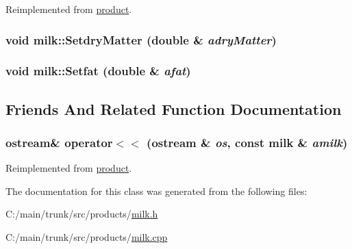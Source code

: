 Reimplemented from \hyperlink{classproduct_a1edb3e3d0619a2db8b8f1c95fed582ce}{product}.\hypertarget{classmilk_a69060a252027a2f9f08e42ed6e2a7db3}{
\subsubsection[{SetdryMatter}]{\setlength{\rightskip}{0pt plus 5cm}void milk::SetdryMatter (double \& {\em adryMatter})}}
\label{classmilk_a69060a252027a2f9f08e42ed6e2a7db3}
\hypertarget{classmilk_a23ab5951cc404f938184aa3b44080719}{
\subsubsection[{Setfat}]{\setlength{\rightskip}{0pt plus 5cm}void milk::Setfat (double \& {\em afat})}}
\label{classmilk_a23ab5951cc404f938184aa3b44080719}


\subsection{Friends And Related Function Documentation}
\hypertarget{classmilk_adc53dfc2bbc4f8463e61ccb3c45f5ee0}{
\subsubsection[{operator$<$$<$}]{\setlength{\rightskip}{0pt plus 5cm}ostream\& operator$<$$<$ (ostream \& {\em os}, \/  const {\bf milk} \& {\em amilk})}}
\label{classmilk_adc53dfc2bbc4f8463e61ccb3c45f5ee0}


Reimplemented from \hyperlink{classproduct_a1b6bf2f2c82a18a17907ee1192fd94bb}{product}.

The documentation for this class was generated from the following files:\begin{DoxyCompactItemize}
\item 
C:/main/trunk/src/products/\hyperlink{milk_8h}{milk.h}\item 
C:/main/trunk/src/products/\hyperlink{milk_8cpp}{milk.cpp}\end{DoxyCompactItemize}
